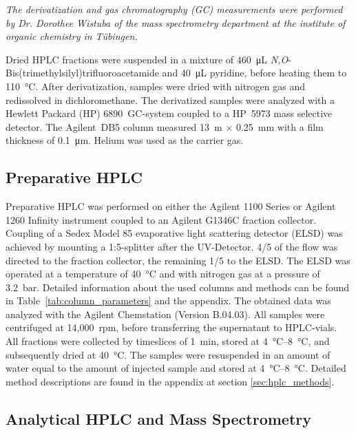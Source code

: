 \emph{The derivatization and gas chromatography (GC) measurements were performed by Dr. Dorothee Wistuba of the mass spectrometry department at the institute of organic chemistry in Tübingen.}

Dried HPLC fractions were suspended in a mixture of \SI{460}{\micro\liter} \emph{N,O}-Bis(trimethylsilyl)\-trifluoro\-acetamide and \SI{40}{\micro\liter} pyridine, before heating them to \SI{110}{\celsius}. After derivatization, samples were dried with nitrogen gas and redissolved in dichloromethane.
The derivatized samples were analyzed with a Hewlett Packard (HP) 6890~GC-system coupled to a HP~5973 mass selective detector. The Agilent~DB5 column measured 13~m $\times$ 0.25~mm with a film thickness of \SI{0.1}{\micro\meter}.
Helium was used as the carrier gas.

\subsection{Preparative HPLC} %
\label{sub:preparative_hplc}

Preparative HPLC was performed on either the Agilent 1100 Series or Agilent 1260 Infinity instrument coupled to an Agilent G1346C fraction collector.
Coupling of a Sedex Model 85 evaporative light scattering detector (ELSD) was achieved by mounting a 1:5-splitter after the UV-Detector.
4/5 of the flow was directed to the fraction collector, the remaining 1/5 to the ELSD.
The ELSD was operated at a temperature of \SI{40}{\celsius} and with nitrogen gas at a pressure of \SI{3.2}{\bar}.
Detailed information about the used columns and methods can be found in Table~\ref{tab:column_parameters} and the appendix.
The obtained data was analyzed with the Agilent Chemstation (Version B.04.03).
All samples were centrifuged at 14,000~rpm, before transferring the supernatant to HPLC-vials.
All fractions were collected by timeslices of \SI{1}{\minute}, stored at \SIrange{4}{8}{\celsius}, and subsequently dried at \SI{40}{\celsius}.
The samples were resuspended in an amount of water equal to the amount of injected sample and stored at \SIrange{4}{8}{\celsius}.
Detailed method descriptions are found in the appendix at section \ref{sec:hplc_methods}.


\subsection{Analytical HPLC and Mass Spectrometry} %
\label{sub:analytical_hplc_and_mass_spectrometry}


